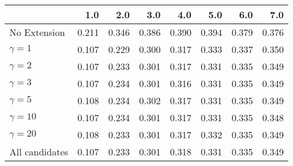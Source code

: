 \begin{tabular}{lrrrrrrr}
\toprule
{} &   1.0 &   2.0 &   3.0 &   4.0 &   5.0 &   6.0 &   7.0 \\
\midrule
No Extension   & 0.211 & 0.346 & 0.386 & 0.390 & 0.394 & 0.379 & 0.376 \\
$\gamma = 1$   & 0.107 & 0.229 & 0.300 & 0.317 & 0.333 & 0.337 & 0.350 \\
$\gamma = 2$   & 0.107 & 0.233 & 0.301 & 0.317 & 0.331 & 0.335 & 0.349 \\
$\gamma = 3$   & 0.107 & 0.234 & 0.301 & 0.316 & 0.331 & 0.335 & 0.349 \\
$\gamma = 5$   & 0.108 & 0.234 & 0.302 & 0.317 & 0.331 & 0.335 & 0.349 \\
$\gamma = 10$  & 0.107 & 0.234 & 0.301 & 0.317 & 0.331 & 0.335 & 0.348 \\
$\gamma = 20$  & 0.108 & 0.233 & 0.301 & 0.317 & 0.332 & 0.335 & 0.349 \\
All candidates & 0.107 & 0.233 & 0.301 & 0.318 & 0.331 & 0.335 & 0.349 \\
\bottomrule
\end{tabular}
